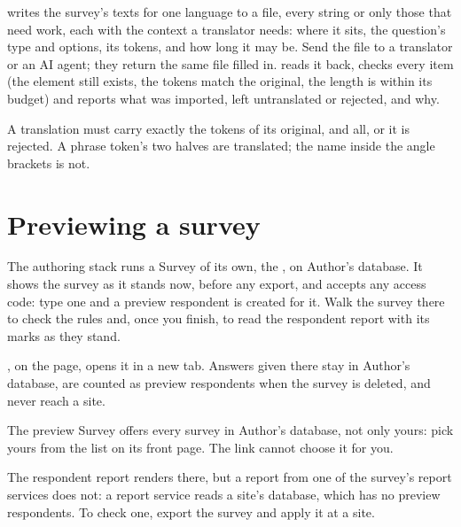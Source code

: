 \documentclass[11pt, a4paper]{article}
\begin{document}
 writes the survey's texts for one language to a file, every string or
only those that need work, each with the context a translator needs: where it sits, the
question's type and options, its tokens, and how long it may be. Send the file to a translator or
an AI agent; they return the same file filled in.  reads it back,
checks every item (the element still exists, the tokens match the original, the length is within
its budget) and reports what was imported, left untranslated or rejected, and why.

\begin{elicitcaution}
A translation must carry exactly the tokens of its original,  and all, or it is
rejected. A phrase token's two halves are translated; the name inside the angle brackets is not.
\end{elicitcaution}

\section{Previewing a survey}
\label{sec:preview}

The authoring stack runs a Survey of its own, the , on Author's database.
It shows the survey as it stands now, before any export, and accepts any access code: type one
and a preview respondent is created for it. Walk the survey there to check the rules and, once
you finish, to read the respondent report with its marks as they stand.


, on the  page, opens it in a new tab. Answers given there
stay in Author's database, are counted as preview respondents when the survey is deleted, and
never reach a site.

\begin{elicitnote}
The preview Survey offers every survey in Author's database, not only yours: pick yours from the
list on its front page. The link cannot choose it for you.

The respondent report renders there, but a report from one of the survey's report services does
not: a report service reads a site's database, which has no preview respondents. To check one,
export the survey and apply it at a site.
\end{elicitnote}
\end{document}
